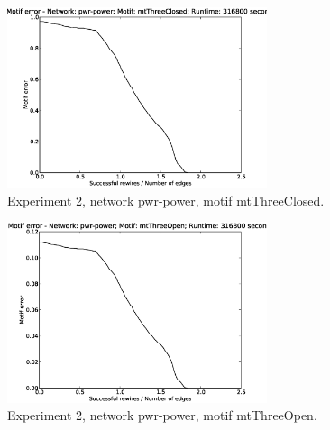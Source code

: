 \begin{figure}[p]
\centering
\includegraphics[width=3in]{Figures/motif_error-pwr-power-mtThreeClosed.eps}
\caption{Experiment 2, network pwr-power, motif mtThreeClosed.}
\label{fig:exp2-pwr-power-mtThreeClosed}
\end{figure}

\begin{figure}[p]
\centering
\includegraphics[width=3in]{Figures/motif_error-pwr-power-mtThreeOpen.eps}
\caption{Experiment 2, network pwr-power, motif mtThreeOpen.}
\label{fig:exp2-pwr-power-mtThreeOpen}
\end{figure}

